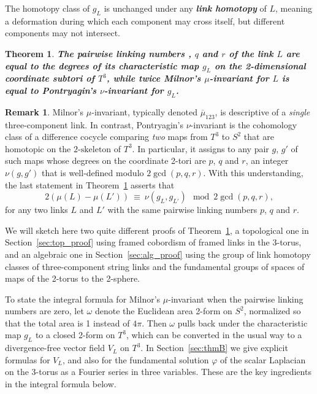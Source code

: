 \documentclass[11pt]{amsart}
\newtheorem{theorem}{Theorem}
\theoremstyle{definition}
\newtheorem*{remark}{Remark}
\newcommand{\thmref}[1]{Theorem~\ref{#1}}
\newcommand{\secref}[1]{Section~\ref{#1}}
\newcommand{\itb}{\bfseries\itshape}
\begin{document}
The homotopy class of $g_L$ is unchanged under  any {\itb link homotopy} of $L$, meaning a deformation during which each component may cross itself, but different components may not intersect.  

\pagebreak

\begin{theorem}\label{thm:A}
	\textbf{The pairwise linking numbers , $q$ and $r$ of the link $L$ are equal to the degrees of its characteristic map $g_L$ on the 2-dimensional \mbox{coordinate} subtori of $T^3$, while twice Milnor's $\mu$-invariant for $L$ is equal to \mbox{Pontryagin's} $\nu$-invariant for $g_L$.}
\end{theorem}
\vspace{.01in}

\begin{remark}
	Milnor's $\mu$-invariant, typically denoted $\overline{\mu}_{123}$, is descriptive of a {\it single} three-component link.  In contrast, Pontryagin's $\nu$-invariant is the cohomology class of a difference cocycle comparing {\it two} maps from $T^3$ to $S^2$ that are homotopic on the $2\text{-skeleton}$ of $T^3$.  In particular, it assigns to any pair $g$, $g'$ of such maps whose degrees on the coordinate 2-tori are $p$, $q$ and $r$, an integer $\nu(g,g')$ that is well-defined modulo $2\gcd(p,q,r)$.  With this understanding, the last statement in \thmref{thm:A} asserts that
	\[
		2(\mu(L) - \mu(L')) \ \equiv \ \nu(g_L,g_{L'}) \mod{2\gcd(p,q,r)},
	\]
for any two links $L$ and $L'$ with the same pairwise linking numbers $p$, $q$ and $r$.
\end{remark}
\vspace{.05in}

We will sketch here two quite different proofs of \thmref{thm:A}, a topological one in \secref{sec:top_proof} using framed cobordism of framed links in the 3-torus, and an algebraic one in \secref{sec:alg_proof} using the group of link homotopy classes of three-component string links and the fundamental groups of spaces of maps of the 2-torus to the 2-sphere.

To state the integral formula for Milnor's $\mu$-invariant when the pairwise linking numbers are zero, let $\omega$ denote the Euclidean area 2-form on $S^2$, normalized so that the total area is 1 instead of $4\pi$.  Then $\omega$ pulls back under the characteristic map $g_L$ to a closed 2-form on $T^3$, which can be converted in the usual way to a divergence-free vector field $V_L$ on $T^3$.  In \secref{sec:thmB} we give  explicit formulas for $V_L$, and also for the fundamental solution $\varphi$ of the scalar Laplacian on the 3-torus as a Fourier series in three variables.  These are the key ingredients in the integral formula below.
\end{document}
